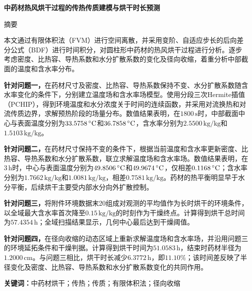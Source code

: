 \begin{center}
{\heiti\bfseries 中药材热风烘干过程的传热传质建模与烘干时长预测}
\end{center}
\vspace{0.5em}
\begin{center}{\heiti{} 摘\quad 要}\end{center}

本文通过有限体积法（FVM）进行空间离散，并采用变阶、自适应步长的后向差分公式（BDF）进行时间积分，对圆柱形中药材的热风烘干过程进行分析。逐步考虑密度、比热容、导热系数和水分扩散系数的变化及径向收缩，着重分析中部截面的温度和含水率分布。

\par\vspace{\baselineskip}
{\heiti\bfseries 针对问题一，}在药材尺寸及密度、比热容、导热系数保持不变、水分扩散系数随含水率变化的条件下，分别建立温度场和含水率场模型。使用分段三次Hermite插值（PCHIP）\cite{fritsch1980monotone}，得到环境温度和水分浓度关于时间的连续函数，并采用对流换热和对流传质边界，求解预热阶段的场量分布。数值结果表明，在$1800\,\mathrm{s}$时，中部截面中心与表面温度分别为$33.5758\,{}^\circ\mathrm{C}$和$36.7858\,{}^\circ\mathrm{C}$，含水率分别为$2.5500\,\mathrm{kg/kg}$和$1.5103\,\mathrm{kg/kg}$。

\par\vspace{\baselineskip}
{\heiti\bfseries 针对问题二，}在药材尺寸保持不变的条件下，根据当前温度和含水率更新密度、比热容、导热系数和水分扩散系数，联立求解温度场和含水率场。数值结果表明，在$3\,\mathrm{h}$时，中心与表面温度分别为$49.8506\,{}^\circ\mathrm{C}$和$49.9674\,{}^\circ\mathrm{C}$，仅相差$0.1168\,{}^\circ\mathrm{C}$；含水率分别为$1.7662\,\mathrm{kg/kg}$和$1.0081\,\mathrm{kg/kg}$，相差$0.7581\,\mathrm{kg/kg}$。药材的热平衡明显早于水分平衡，后续烘干主要受内部水分向外扩散控制。

\par\vspace{\baselineskip}
{\heiti\bfseries 针对问题三，}将附件环境数据末20组成对观测的平均值作为长时烘干的环境条件，以全域最大含水率首次降至$0.15\,\mathrm{kg/kg}$的时刻作为干燥终点。计算得到烘干总时间为$57.4354\,\mathrm{h}$；全域扫描结果显示，几何中心最后达到干燥阈值。

\par\vspace{\baselineskip}
{\heiti\bfseries 针对问题四，}在径向收缩的动态区域上重新求解温度场和含水率场，并沿用问题三的环境延拓条件和干燥判据。计算得到烘干时间为$51.0583\,\mathrm{h}$，结束时药材半径为$1.2000\,\mathrm{cm}$。与问题三相比，烘干时长减少$6.3772\,\mathrm{h}$，即$11.10\%$；该时间差反映了半径变化及密度、比热容、导热系数和水分扩散系数变化的共同作用。

\par\vspace{\baselineskip}
\noindent\textbf{关键词：}中药材烘干；传热；传质；有限体积法；径向收缩
